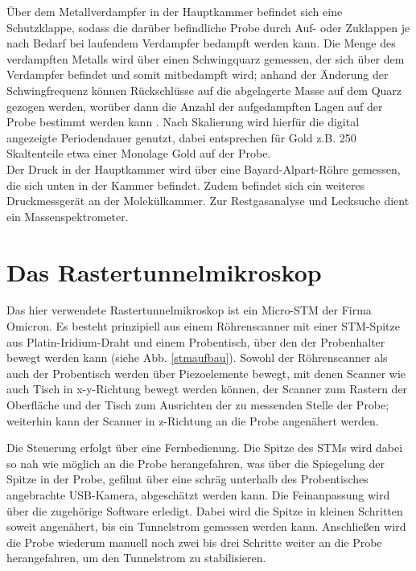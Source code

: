  Über dem Metallverdampfer in der Hauptkammer befindet sich eine
Schutzklappe, sodass die darüber befindliche Probe durch Auf- oder Zuklappen je nach Bedarf bei
laufendem Verdampfer bedampft werden kann. Die Menge des verdampften Metalls wird über einen
Schwingquarz gemessen, der sich über dem Verdampfer befindet und somit mitbedampft wird; anhand der
Änderung der Schwingfrequenz können Rückschlüsse auf die abgelagerte Masse auf dem Quarz gezogen
werden, worüber dann die Anzahl der aufgedampften Lagen auf der Probe bestimmt werden kann
\cite{Sau}.
Nach Skalierung wird hierfür die digital angezeigte Periodendauer genutzt, dabei entsprechen für Gold
z.B. 250 Skaltenteile etwa einer Monolage Gold auf der Probe.\\
Der Druck in der Hauptkammer wird über eine Bayard-Alpart-Röhre gemessen, die sich unten in der
Kammer befindet. Zudem befindet sich ein weiteres Druckmessgerät %
an der Molekülkammer.
Zur Restgasanalyse und Lecksuche dient ein Massenspektrometer.%


\section{Das Rastertunnelmikroskop}

Das hier verwendete Rastertunnelmikroskop ist ein Micro-STM der Firma Omicron. Es besteht
prinzipiell aus einem Röhrenscanner mit einer STM-Spitze aus Platin-Iridium-Draht und einem
Probentisch, über den der Probenhalter bewegt werden kann (siehe Abb. \ref{stmaufbau}). Sowohl der
Röhren\-scanner als auch der Probentisch werden über Piezoelemente bewegt, mit denen Scanner
wie auch Tisch in x-y-Richtung bewegt werden können, der Scanner zum Rastern der Oberfläche und der
Tisch zum Ausrichten der zu messenden Stelle der Probe; weiterhin kann der Scanner in z-Richtung an
die Probe angenähert werden.

Die Steuerung erfolgt über eine Fernbedienung.
Die Spitze des STMs wird dabei so nah wie möglich an die Probe herangefahren, was über die
Spiegelung der Spitze in der Probe, gefilmt über eine schräg unterhalb des Probentisches angebrachte
USB-Kamera, abgeschätzt werden kann. Die Feinanpassung wird über die zugehörige Software erledigt.
Dabei wird die Spitze in kleinen Schritten soweit angenähert, bis ein Tunnelstrom gemessen werden
kann. Anschließen wird die Probe wiederum manuell noch zwei bis drei Schritte weiter an die Probe
herangefahren, um den Tunnelstrom zu stabilisieren.\\

